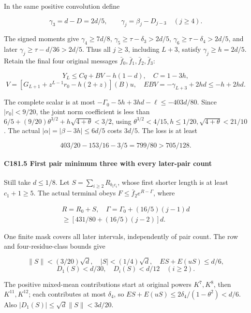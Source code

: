 In the same positive convolution define

\[
\gamma_3=d-D=2d/5,\qquad
\gamma_j=\beta_j-D_{j-3}\quad(j\ge4).
\]

The signed moments give \(\gamma_4\ge7d/8\), \(\gamma_5\ge\tau-\delta_3>2d/5\), \(\gamma_6\ge\tau-\delta_4>2d/5\), and later \(\gamma_j\ge\tau-d/36>2d/5\). Thus all \(j\ge3\), including \(L+3\), satisfy \(\gamma_j\ge h=2d/5\). Retain the final four original messages \(\bar f_0,\allowbreak \allowbreak  \bar f_1,\allowbreak \allowbreak  \bar f_2,\allowbreak \allowbreak  \bar f_3\):

\[
Y_L\le Cq+BV-h(1-d),\quad C=1-3h,
\]
\[
V=[G_{L+1}+z^{L-1}r_0-h(2+z)](B)u,
\quad EBV=-\gamma_{L+3}+2hd\le-h+2hd.
\]

The complete scalar is at most \(-\Gamma_0-5h+3hd-\ell\le-403d/80\). Since \(|r_0|<9/20\), the joint norm coefficient is less than \(6/5+(9/20)\theta^{3/2}+h\sqrt{4+\theta}<3/2\), using \(\theta^{3/2}<4/15,\allowbreak \allowbreak  h\le1/20,\allowbreak \allowbreak  \sqrt{4+\theta}<21/10\). The actual \(|\alpha|=|\beta-3h|\le6d/5\) costs \(3d/5\). The loss is at least

\[
403/20-153/16-3/5=799/80>705/128.
\tag{C181.T190.26}
\]

\paragraph{C181.5 First pair minimum three with every later-pair count}

Still take \(d\le1/8\). Let \(S=\sum_{i\ge2}R_{b_ic_i}\), whose first shorter length is at least \(c_1+1\ge5\). The actual terminal obeys \(F\le\bar f_2e^{R-\Gamma}\), where

\[
\begin{gathered}
R=R_0+S,\quad \Gamma=\Gamma_0+(16/5)(j-1)d\\
\ge[431/80+(16/5)(j-2)]d.
\end{gathered}\tag{C181.T190.27}
\]

One finite mask covers all later intervals, independently of pair count. The row and four-residue-class bounds give

\[
\|S\|<(3/20)\sqrt d,\quad |S|<(1/4)\sqrt d,
\quad ES+E(uS)\le d/6,
\]
\[
D_1(S)<d/30,\quad D_i(S)<d/12\quad(i\ge2).
\tag{C181.T190.28}
\]

The positive mixed-mean contributions start at original powers \(K^7,\allowbreak \allowbreak  K^8\), then \(K^{11},\allowbreak \allowbreak  K^{12}\); each contributes at most \(\delta_4\), so \(ES+E(uS)\le2\delta_4/(1-\theta^2)<d/6\). Also \(|D_1(S)|\le\sqrt d\|S\|<3d/20\).

